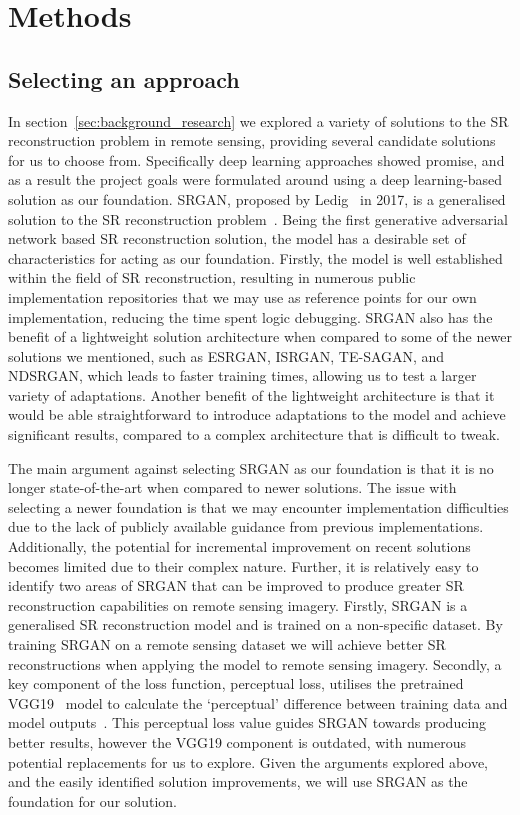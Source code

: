 \chapter{Methods}\label{chapter2}
\section{Selecting an approach}\label{sec:selecting_an_approach}
In section~\ref{sec:background_research} we explored a variety of solutions to the SR reconstruction problem in remote sensing, providing several candidate solutions for us to choose from. Specifically deep learning approaches showed promise, and as a result the project goals were formulated around using a deep learning-based solution as our foundation. SRGAN, proposed by Ledig \etal\ in 2017, is a generalised solution to the SR reconstruction problem~\cite{srgan}. Being the first generative adversarial network based SR reconstruction solution, the model has a desirable set of characteristics for acting as our foundation. Firstly, the model is well established within the field of SR reconstruction, resulting in numerous public implementation repositories that we may use as reference points for our own implementation, reducing the time spent logic debugging. SRGAN also has the benefit of a lightweight solution architecture when compared to some of the newer solutions we mentioned, such as ESRGAN, ISRGAN, TE-SAGAN, and NDSRGAN, which leads to faster training times, allowing us to test a larger variety of adaptations. Another benefit of the lightweight architecture is that it would be able straightforward to introduce adaptations to the model and achieve significant results, compared to a complex architecture that is difficult to tweak.

The main argument against selecting SRGAN as our foundation is that it is no longer state-of-the-art when compared to newer solutions. The issue with selecting a newer foundation is that we may encounter implementation difficulties due to the lack of publicly available guidance from previous implementations. Additionally, the potential for incremental improvement on recent solutions becomes limited due to their complex nature. Further, it is relatively easy to identify two areas of SRGAN that can be improved to produce greater SR reconstruction capabilities on remote sensing imagery. Firstly, SRGAN is a generalised SR reconstruction model and is trained on a non-specific dataset. By training SRGAN on a remote sensing dataset we will achieve better SR reconstructions when applying the model to remote sensing imagery. Secondly, a key component of the loss function, perceptual loss, utilises the pretrained VGG19~\cite{vgg19} model to calculate the `perceptual' difference between training data and model outputs~\cite{srgan}. This perceptual loss value guides SRGAN towards producing better results, however the VGG19 component is outdated, with numerous potential replacements for us to explore. Given the arguments explored above, and the easily identified solution improvements, we will use SRGAN as the foundation for our solution.

